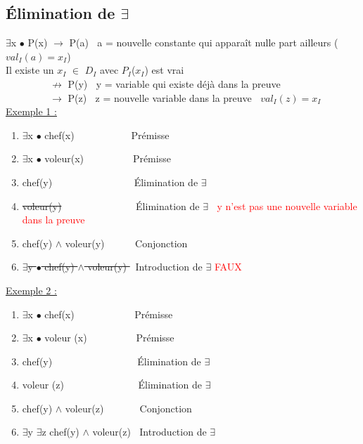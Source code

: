 \begin{flushleft}
\section{Élimination de $\exists$}
$\exists$x $\bullet$ P(x) $\rightarrow$ P(a) $\>$ a = nouvelle constante qui apparaît nulle part ailleurs ($val_{I}(a) = x_{I}$)\\
Il existe un $x_{I}$ $\in$ $D_{I}$ avec $P_{I}$($x_{I}$) est vrai\\
$\>$ $\>$ $\>$ $\>$ $\>$ $\>$ $\>$ $\>$ $\nrightarrow$ P(y) $\>$ y = variable qui existe d\'ej\`a dans la preuve \\
$\>$ $\>$ $\>$ $\>$ $\>$ $\>$ $\>$ $\>$ $\rightarrow$ P(z) $\>$ z = nouvelle variable dans la preuve $\>$ $val_{I}(z) = x_{I}$\\
\underline{Exemple 1 :}\\
\begin{enumerate}
\item $\exists$x $\bullet$ chef(x) $\>$ $\>$ $\>$ $\>$ $\>$ $\>$ $\>$ $\>$ $\>$ $\>\>$Pr\'emisse
\item $\exists$x $\bullet$ voleur(x) $\>$ $\>$ $\>$ $\>$ $\>$ $\>$ $\>$ $\>$  $\>$Pr\'emisse
\item chef(y) $\>$ $\>$ $\>$ $\>$ $\>$ $\>$ $\>$ $\>$ $\>$ $\>$ $\>$ $\>$ $\>$ $\>$ $\>$Élimination de $\exists$
\item \sout{voleur(y)} $\>$ $\>$ $\>$ $\>$ $\>$ $\>$ $\>$ $\>$ $\>$ $\>$ $\>$ $\>$ $\>$ Élimination de $\exists$ $\>$ \textcolor{red}{y n'est pas une nouvelle variable dans la preuve}
\item chef(y) $\wedge$ voleur(y) $\>$ $\>$ $\>$ $\>$ $\>$ Conjonction
\item \sout{$\exists$y $\bullet$ chef(y) $\wedge$ voleur(y) $\>$} Introduction de $\exists$ \textcolor{red}{FAUX}
\end{enumerate}

\underline{Exemple 2 :}\\
\begin{enumerate}
\item $\exists$x $\bullet$ chef(x) $\>$ $\>$ $\>$ $\>$ $\>$ $\>$ $\>$ $\>$ $\>$ $\>$ $\>$Pr\'emisse
\item $\exists$x $\bullet$ voleur (x) $\>$ $\>$ $\>$ $\>$ $\>$ $\>$ $\>$ $\>$ $\>$Pr\'emisse
\item chef(y) $\>$ $\>$ $\>$ $\>$ $\>$ $\>$ $\>$ $\>$ $\>$ $\>$ $\>$ $\>$ $\>$ $\>$ $\>$ Élimination de $\exists$
\item voleur (z) $\>$ $\>$ $\>$ $\>$ $\>$ $\>$ $\>$ $\>$ $\>$ $\>$ $\>$ $\>$ $\>$ Élimination de $\exists$
\item chef(y) $\wedge$ voleur(z) $\>$ $\>$ $\>$ $\>$ $\>$ $\>$ Conjonction
\item $\exists$y $\exists$z chef(y) $\wedge$ voleur(z) $\>$ Introduction de $\exists$
\end{enumerate}


\end{flushleft}
